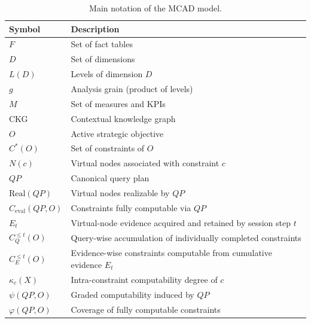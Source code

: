 \begin{table}[!t]
\centering
\caption{Main notation of the MCAD model.}
\scriptsize
\begin{tabularx}{\columnwidth}{@{}p{2.35cm}X@{}}
\toprule
Symbol & Description \\
\midrule
$F$ & Set of fact tables \\
$D$ & Set of dimensions \\
$L(D)$ & Levels of dimension $D$ \\
$g$ & Analysis grain (product of levels) \\
$M$ & Set of measures and KPIs \\
CKG & Contextual knowledge graph \\
$O$ & Active strategic objective \\
$C^*(O)$ & Set of constraints of $O$ \\
$N(c)$ & Virtual nodes associated with constraint $c$ \\
$QP$ & Canonical query plan \\
$\mathrm{Real}(QP)$ & Virtual nodes realizable by $QP$ \\
$C_{\mathrm{eval}}(QP,O)$ & Constraints fully computable via $QP$ \\
$E_t$ & Virtual-node evidence acquired and retained by session step $t$ \\
$C_Q^{\le t}(O)$ & Query-wise accumulation of individually completed constraints \\
$C_E^{\le t}(O)$ & Evidence-wise constraints computable from cumulative evidence $E_t$ \\
$\kappa_c(X)$ & Intra-constraint computability degree of $c$ \\
$\psi(QP,O)$ & Graded computability induced by $QP$ \\
$\varphi(QP,O)$ & Coverage of fully computable constraints \\
\bottomrule
\end{tabularx}
\label{tab:notation}
\normalsize
\end{table}
